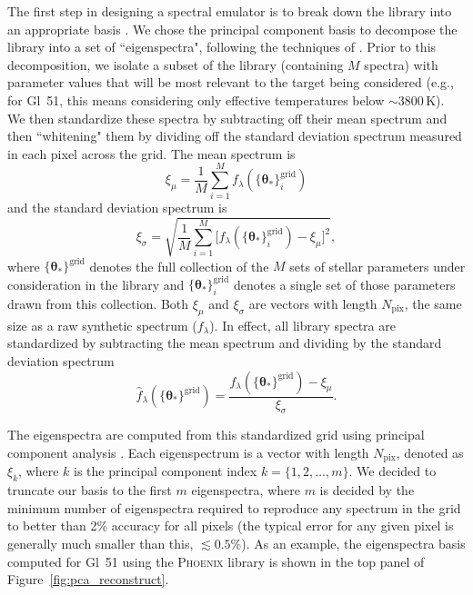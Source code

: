 \documentclass[iop,floatfix,numberedappendix,twocolappendix]{emulateapj}
\newcommand{\vt}{ {\bm \theta}}
\begin{document}
The first step in designing a spectral emulator is to break down the library into an appropriate 
basis \citep{habib07, heitmann09}.  We chose the principal component basis to decompose the library 
into a set of ``eigenspectra", following the techniques of \citet{ivezic13}.  Prior to this 
decomposition, we isolate a subset of the library (containing $M$ spectra) with parameter values 
that will be most relevant to the target being considered (e.g., for Gl~51, this means considering 
only effective temperatures below $\sim$3800\,K).  We then standardize these spectra by subtracting 
off their mean spectrum and then ``whitening" them by dividing off the standard deviation spectrum 
measured in each pixel across the grid.  The mean spectrum is 
\begin{equation}
  \xi_\mu = \frac{1}{M} \sum_{i = 1}^M f_\lambda(\{\vt_\ast \}^\textrm{grid}_i)
\end{equation}
and the standard deviation spectrum is
\begin{equation}
  \xi_\sigma = \sqrt{\frac{1}{M} \sum_{i=1}^M \bigl [ f_\lambda(\{\vt_\ast \}^\textrm{grid}_i) - \xi_\mu \bigr]^2 }, 
\end{equation}
where $\{\vt_\ast \}^\textrm{grid}$ denotes the full collection of the $M$ sets of stellar 
parameters under consideration in the library and $\{\vt_\ast \}^\textrm{grid}_i$ denotes a single 
set of those parameters drawn from this collection. Both $\xi_\mu$ and $\xi_\sigma$ are
vectors with length $N_\textrm{pix}$, the same size as a
raw synthetic spectrum ($f_\lambda$). In effect, all library spectra are 
standardized by subtracting the mean spectrum and dividing by the standard deviation spectrum
\begin{equation}
  \hat{f}_\lambda(\{\vt_\ast \}^\textrm{grid}) = \frac{f_\lambda(\{\vt_\ast \}^\textrm{grid}) - \xi_\mu}{\xi_\sigma}.
\end{equation}

The eigenspectra are computed from this standardized grid using principal component analysis
\citep[PCA;][]{ivezic13}. Each eigenspectrum is a vector with length $N_\textrm{pix}$, denoted as
$\xi_k$, where $k$ is the principal component index $k = \{1, 2, \ldots, m\}$. We decided to
truncate our basis to the first $m$ eigenspectra, where $m$ is decided by the minimum number of
eigenspectra required to reproduce any spectrum in the grid to better than 2\% accuracy for all
pixels (the typical error for any given pixel is generally much smaller than this, $\lesssim
0.5\%$). As an example, the eigenspectra basis computed for Gl~51 using the \textsc{Phoenix} library
is shown in the top panel of Figure~\ref{fig:pca_reconstruct}.
\end{document}
